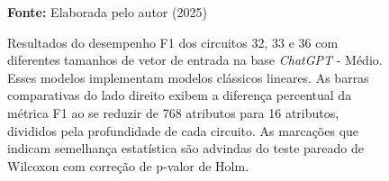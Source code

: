 \begin{figure}
\caption{Resultados do desempenho F1 dos circuitos 32, 33 e 36 com diferentes tamanhos de vetor de entrada na base \textit{ChatGPT} - Médio. Esses modelos implementam modelos clássicos lineares. As barras comparativas do lado direito exibem a diferença percentual da métrica F1 ao se reduzir de 768 atributos para 16 atributos, divididos pela profundidade de cada circuito. As marcações que indicam semelhança estatística são advindas do teste pareado de Wilcoxon com correção de p-valor de Holm.}
\label{fig:n_features:medium:g4}
     \centering
    \centering
      \par\medskip\ABNTEXfontereduzida\selectfont\textbf{Fonte:} Elaborada pelo autor (2025) \par\medskip
\end{figure}